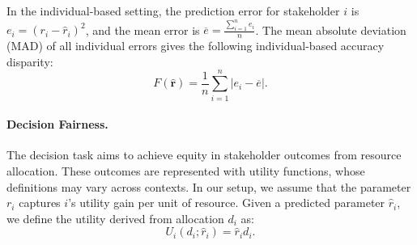 \documentclass[ijoc,sglanonrev]{informs4}
\begin{document}
In the individual-based setting, the prediction error for stakeholder $i$ is $e_{i} = (r_{i}-\hat{r}_{i})^2$, and the mean error is $\overline{e} = \frac{\sum_{i=1}^n e_{i}}{n}$. The mean absolute deviation (MAD) of all individual errors gives the following individual-based accuracy disparity:
\begin{equation} \label{def:ind-acc-parity}
    F(\hat{\mathbf{r}}) = \frac{1}{n} \sum_{i=1}^n |e_i - \overline{e}|.
\end{equation}

\paragraph{Decision Fairness.}
The decision task aims to achieve equity in stakeholder outcomes from resource allocation. These outcomes are represented with utility functions, whose definitions may vary across contexts. In our setup, we assume that the parameter $r_i$ captures $i$'s utility gain per unit of resource. Given a predicted parameter $\hat{r}_i$, we define the utility derived from allocation $d_i$ as:
\begin{equation} \label{eq:udef}
   U_i(d_i; \hat{r}_i) = \hat{r}_i d_{i}.
\end{equation}
\end{document}
